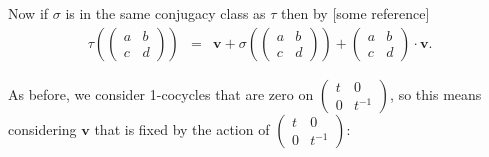 Now if $\sigma$ is in the same conjugacy class as $\tau$ then by [some reference]
\begin{eqnarray*}
\tau\left(
\left(\begin{matrix} a & b \\ c & d\end{matrix}\right)
\right) &=&
\mathbf{v} +
\sigma\left(
\left(\begin{matrix} a & b \\ c & d\end{matrix}\right)
\right) 
+\left(\begin{matrix} a & b \\ c & d\end{matrix}\right)\cdot \mathbf{v}.
\end{eqnarray*}

As before, we consider 1-cocycles that are zero on $\left(\begin{matrix} t & 0 \\ 0 & t^{-1}\end{matrix}\right)$, so this means considering $\mathbf{v}$ that is fixed by the action of $\left(\begin{matrix} t & 0 \\ 0 & t^{-1}\end{matrix}\right)$:

